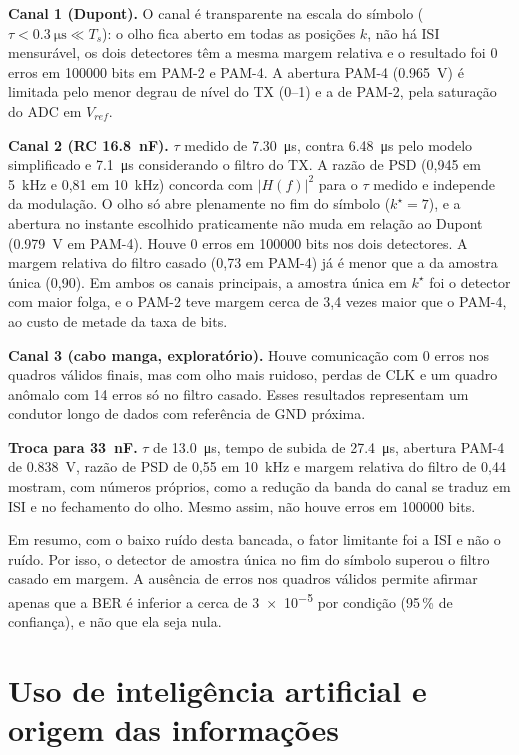 \documentclass[12pt,a4paper]{article}
\begin{document}
\textbf{Canal 1 (Dupont).} O canal é transparente na escala do símbolo ($\tau < \SI{0,3}{\micro\second}
\ll T_s$): o olho fica aberto em todas as posições $k$, não há ISI mensurável, os dois detectores têm
a mesma margem relativa e o resultado foi 0 erros em \num{100000} bits em PAM-2 e PAM-4. A abertura
PAM-4 (\SI{0,965}{V}) é limitada pelo menor degrau de nível do TX (0--1) e a de PAM-2, pela saturação
do ADC em $V_{ref}$.

\textbf{Canal 2 (RC \SI{16,8}{nF}).} $\tau$ medido de \SI{7,30}{\micro\second}, contra
\SI{6,48}{\micro\second} pelo modelo simplificado e \SI{7,1}{\micro\second} considerando o filtro do
TX. A razão de PSD (0,945 em \SI{5}{kHz} e 0,81 em \SI{10}{kHz}) concorda com $|H(f)|^2$ para o
$\tau$ medido e independe da modulação. O olho só abre plenamente no fim do símbolo ($k^\star=7$), e
a abertura no instante escolhido praticamente não muda em relação ao Dupont (\SI{0,979}{V} em PAM-4).
Houve 0 erros em \num{100000} bits nos dois detectores. A margem relativa do filtro casado
(0,73 em PAM-4) já é menor que a da amostra única (0,90). Em ambos os canais principais, a amostra
única em $k^\star$ foi o detector com maior folga, e o PAM-2 teve margem cerca de 3,4 vezes maior que
o PAM-4, ao custo de metade da taxa de bits.

\textbf{Canal 3 (cabo manga, exploratório).} Houve comunicação com 0 erros nos quadros válidos finais,
mas com olho mais ruidoso, perdas de CLK e um quadro anômalo com 14 erros só no filtro casado. Esses
resultados representam um condutor longo de dados com referência de GND próxima.

\textbf{Troca para \SI{33}{nF}.} $\tau$ de \SI{13,0}{\micro\second}, tempo de subida de
\SI{27,4}{\micro\second}, abertura PAM-4 de \SI{0,838}{V}, razão de PSD de 0,55 em \SI{10}{kHz} e
margem relativa do filtro de 0,44 mostram, com números próprios, como a redução da banda do canal se
traduz em ISI e no fechamento do olho. Mesmo assim, não houve erros em \num{100000} bits.

Em resumo, com o baixo ruído desta bancada, o fator limitante foi a ISI e não o ruído. Por isso, o
detector de amostra única no fim do símbolo superou o filtro casado em margem. A ausência de erros nos
quadros válidos permite afirmar apenas que a BER é inferior a cerca de \num{3e-5} por condição (95\,\%
de confiança), e não que ela seja nula.

\section{Uso de inteligência artificial e origem das informações}
\end{document}
